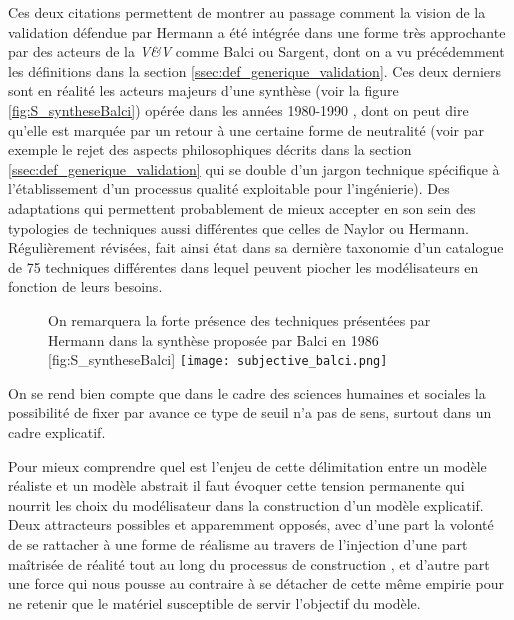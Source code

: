 Ces deux citations permettent de montrer au passage comment la vision de la validation défendue par Hermann a été intégrée dans une forme très approchante par des acteurs de la \textit{V\&V} comme Balci ou Sargent, dont on a vu précédemment les définitions dans la section \ref{ssec:def_generique_validation}. Ces deux derniers sont en réalité les acteurs majeurs d'une synthèse (voir la figure \ref{fig:S_syntheseBalci}) opérée dans les années 1980-1990 \autocite{Nance2002}, dont on peut dire qu'elle est marquée par un retour à une certaine forme de neutralité (voir par exemple le rejet des aspects philosophiques décrits dans la section \ref{ssec:def_generique_validation} qui se double d'un jargon technique spécifique à l'établissement d'un processus qualité exploitable pour l'ingénierie). Des adaptations qui permettent probablement de mieux accepter en son sein des typologies de techniques aussi différentes que celles de Naylor ou Hermann. Régulièrement révisées, \textcite{Balci1998} fait ainsi état dans sa dernière taxonomie d'un catalogue de 75 techniques différentes dans lequel peuvent piocher les modélisateurs en fonction de leurs besoins.

\begin{figure}[htbp]
\begin{sidecaption}[fortoc]{ On remarquera la forte présence des techniques présentées par Hermann dans la synthèse proposée par Balci en 1986 \autocite{Balci1986}}[fig:S_syntheseBalci]
  \centering
 \texttt{[image: subjective\_balci.png]}
  \end{sidecaption}
\end{figure}

On se rend bien compte que dans le cadre des sciences humaines et sociales la possibilité de fixer par avance ce type de seuil n'a pas de sens, surtout dans un cadre explicatif.


Pour mieux comprendre quel est l'enjeu de cette délimitation entre un modèle réaliste et un modèle abstrait il faut évoquer cette tension permanente qui nourrit les choix du modélisateur dans la construction d'un modèle explicatif. Deux attracteurs possibles et apparemment opposés, avec d'une part la volonté de se rattacher à une forme de réalisme au travers de l'injection d'une part maîtrisée de réalité tout au long du processus de construction , et d'autre part une force qui nous pousse au contraire à se détacher de cette même empirie pour ne retenir que le matériel susceptible de servir l'objectif du modèle.

